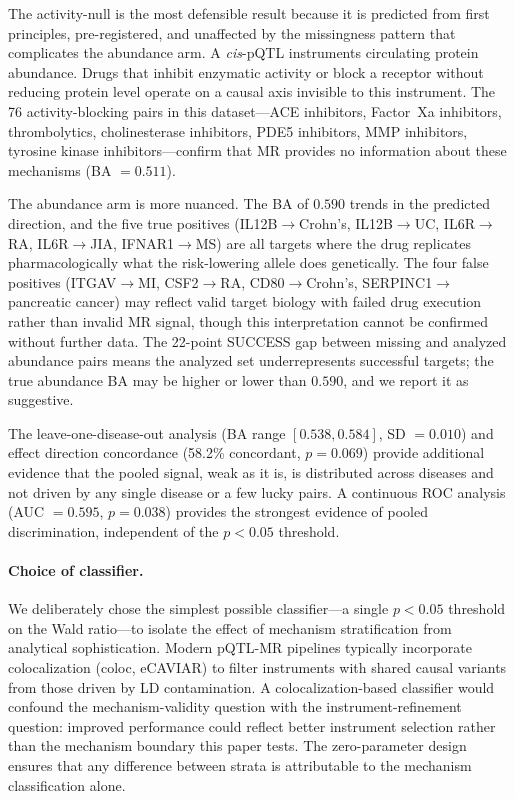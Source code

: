 \documentclass[11pt]{article}
\begin{document}
The activity-null is the most defensible result because it is predicted from first principles, pre-registered, and unaffected by the missingness pattern that complicates the abundance arm. A \emph{cis}-pQTL instruments circulating protein abundance. Drugs that inhibit enzymatic activity or block a receptor without reducing protein level operate on a causal axis invisible to this instrument. The 76 activity-blocking pairs in this dataset---ACE inhibitors, Factor~Xa inhibitors, thrombolytics, cholinesterase inhibitors, PDE5 inhibitors, MMP inhibitors, tyrosine kinase inhibitors---confirm that MR provides no information about these mechanisms (BA $= 0.511$).

The abundance arm is more nuanced. The BA of $0.590$ trends in the predicted direction, and the five true positives (IL12B$\rightarrow$Crohn's, IL12B$\rightarrow$UC, IL6R$\rightarrow$RA, IL6R$\rightarrow$JIA, IFNAR1$\rightarrow$MS) are all targets where the drug replicates pharmacologically what the risk-lowering allele does genetically. The four false positives (ITGAV$\rightarrow$MI, CSF2$\rightarrow$RA, CD80$\rightarrow$Crohn's, SERPINC1$\rightarrow$pancreatic cancer) may reflect valid target biology with failed drug execution rather than invalid MR signal, though this interpretation cannot be confirmed without further data. The 22-point SUCCESS gap between missing and analyzed abundance pairs means the analyzed set underrepresents successful targets; the true abundance BA may be higher or lower than $0.590$, and we report it as suggestive.

The leave-one-disease-out analysis (BA range $[0.538, 0.584]$, SD $= 0.010$) and effect direction concordance (58.2\% concordant, $p = 0.069$) provide additional evidence that the pooled signal, weak as it is, is distributed across diseases and not driven by any single disease or a few lucky pairs. A continuous ROC analysis (AUC $= 0.595$, $p = 0.038$) provides the strongest evidence of pooled discrimination, independent of the $p < 0.05$ threshold.

\paragraph{Choice of classifier.}
We deliberately chose the simplest possible classifier---a single $p < 0.05$ threshold on the Wald ratio---to isolate the effect of mechanism stratification from analytical sophistication. Modern pQTL-MR pipelines typically incorporate colocalization (coloc, eCAVIAR) to filter instruments with shared causal variants from those driven by LD contamination. A colocalization-based classifier would confound the mechanism-validity question with the instrument-refinement question: improved performance could reflect better instrument selection rather than the mechanism boundary this paper tests. The zero-parameter design ensures that any difference between strata is attributable to the mechanism classification alone.
\end{document}
